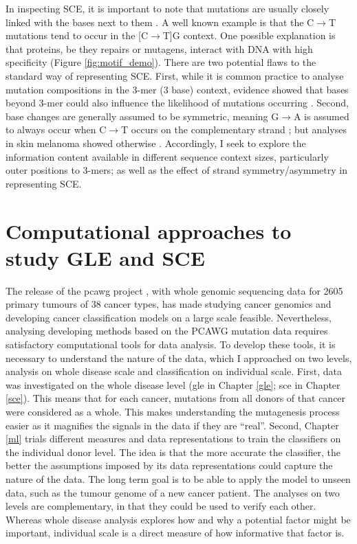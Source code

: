In inspecting SCE, it is important to note that mutations are usually closely linked with the \glspl{base} next to them \citep{Zhu2017}. A well known example is that the C$\rightarrow$T mutations tend to occur in the [C$\rightarrow$T]G context. One possible explanation is that proteins, be they repairs or mutagens, interact with DNA with high specificity (Figure \ref{fig:motif_demo}). There are two potential flaws to the standard way of representing SCE. First, while it is common practice to analyse mutation compositions in the 3-mer (3 base) context, evidence showed that bases beyond 3-mer could also influence the likelihood of mutations occurring \citep{Zhu2017,Zhu2020}. Second, base changes are generally assumed to be symmetric, meaning G$\rightarrow$A is assumed to always occur when C$\rightarrow$T occurs on the complementary strand \citep[Figure \ref{fig:motif_symmetric_demo};][]{Alexandrov2013, Jiao2020}; but analyses in skin melanoma showed otherwise \citep{Zhu2017}. Accordingly, I seek to explore the information content available in different sequence context sizes, particularly outer positions to 3-mers; as well as the effect of strand symmetry/asymmetry in representing SCE.




\section{Computational approaches to study GLE and SCE}
\label{intro:ml}

The release of the \gls{pcawg} project \citep{Campbell2020}, with whole genomic sequencing data for 2605 primary tumours of 38 cancer types, has made studying cancer genomics and developing cancer classification models on a large scale feasible. Nevertheless, analysing developing methods based on the PCAWG mutation data requires satisfactory computational tools for data analysis. To develop these tools, it is necessary to understand the nature of the data, which I approached on two levels, analysis on whole disease scale and classification on individual scale. First, data was investigated on the whole disease level (\gls{gle} in Chapter \ref{gle}; \gls{sce} in Chapter \ref{sce}). This means that for each cancer, mutations from all donors of that cancer were considered as a whole. This makes understanding the mutagenesis process easier as it magnifies the signals in the data if they are ``real''. Second, Chapter \ref{ml} trials different measures and data representations to train the classifiers on the individual donor level. The idea is that the more accurate the classifier, the better the assumptions imposed by its data representations could capture the nature of the data. The long term goal is to be able to apply the model to unseen data, such as the tumour genome of a new cancer patient. The analyses on two levels are complementary, in that they could be used to verify each other. Whereas whole disease analysis explores how and why a potential factor might be important, individual scale is a direct measure of how informative that factor is.  

